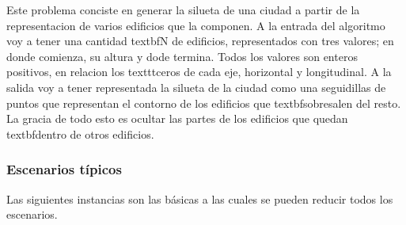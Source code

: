 Este problema conciste en generar la silueta de una ciudad a partir de la representacion de varios edificios que la componen.
A la entrada del algoritmo voy a tener una cantidad textbf{N} de edificios, representados con tres valores; en donde comienza, su altura y dode termina. Todos los valores son enteros positivos, en relacion los texttt{ceros} de cada eje, horizontal y longitudinal.
A la salida voy a tener representada la silueta de la ciudad como una seguidillas de puntos que representan el contorno de los edificios que textbf{sobresalen} del resto.
La gracia de todo esto es ocultar las partes de los edificios que quedan textbf{dentro} de otros edificios.

\subsubsection*{Escenarios t\'ipicos}

Las siguientes instancias son las b\'asicas a las cuales se pueden reducir todos los escenarios.


